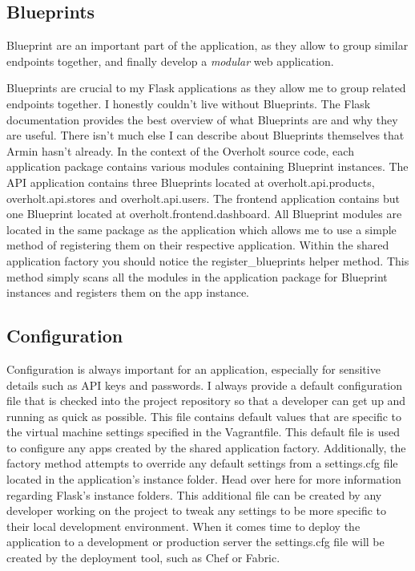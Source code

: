 \subsection{Blueprints}
Blueprint are an important part of the application, as they allow to group similar endpoints together, and finally develop a \emph{modular} web application. 

Blueprints are crucial to my Flask applications as they allow me to group related endpoints together. I honestly couldn't live without Blueprints. The Flask documentation provides the best overview of what Blueprints are and why they are useful. There isn't much else I can describe about Blueprints themselves that Armin hasn't already. In the context of the Overholt source code, each application package contains various modules containing Blueprint instances. The API application contains three Blueprints located at overholt.api.products, overholt.api.stores and overholt.api.users. The frontend application contains but one Blueprint located at overholt.frontend.dashboard. All Blueprint modules are located in the same package as the application which allows me to use a simple method of registering them on their respective application. Within the shared application factory you should notice the register\_blueprints helper method. This method simply scans all the modules in the application package for Blueprint instances and registers them on the app instance.

\subsection{Configuration}
Configuration is always important for an application, especially for sensitive details such as API keys and passwords. I always provide a default configuration file that is checked into the project repository so that a developer can get up and running as quick as possible. This file contains default values that are specific to the virtual machine settings specified in the Vagrantfile. This default file is used to configure any apps created by the shared application factory. Additionally, the factory method attempts to override any default settings from a settings.cfg file located in the application's instance folder. Head over here for more information regarding Flask's instance folders. This additional file can be created by any developer working on the project to tweak any settings to be more specific to their local development environment. When it comes time to deploy the application to a development or production server the settings.cfg file will be created by the deployment tool, such as Chef or Fabric.

